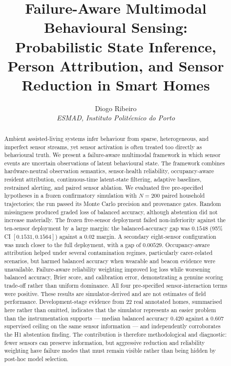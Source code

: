 \documentclass[11pt]{article}
\title{Failure-Aware Multimodal Behavioural Sensing:\\
Probabilistic State Inference, Person Attribution, and Sensor Reduction in Smart Homes}
\author{Diogo Ribeiro\\
\small \textit{ESMAD, Instituto Politécnico do Porto}}
\date{}
\begin{document}
\maketitle

\begin{abstract}
Ambient assisted-living systems infer behaviour from sparse, heterogeneous, and imperfect sensor streams, yet sensor activation is often treated too directly as behavioural truth. We present a failure-aware multimodal framework in which sensor events are uncertain observations of latent behavioural state. The framework combines hardware-neutral observation semantics, sensor-health reliability, occupancy-aware resident attribution, continuous-time latent-state filtering, adaptive baselines, restrained alerting, and paired sensor ablation. We evaluated five pre-specified hypotheses in a frozen confirmatory simulation with $N=200$ paired household trajectories; the run passed its Monte Carlo precision and provenance gates. Random missingness produced graded loss of balanced accuracy, although abstention did not increase materially. The frozen five-sensor deployment failed non-inferiority against the ten-sensor deployment by a large margin: the balanced-accuracy gap was $0.1548$ (95\% CI $[0.1531,0.1564]$) against a $0.02$ margin. A secondary eight-sensor configuration was much closer to the full deployment, with a gap of $0.00529$. Occupancy-aware attribution helped under several contamination regimes, particularly carer-related scenarios, but harmed balanced accuracy when wearable and beacon evidence were unavailable. Failure-aware reliability weighting improved log loss while worsening balanced accuracy, Brier score, and calibration error, demonstrating a genuine scoring trade-off rather than uniform dominance. All four pre-specified sensor-interaction terms were positive. These results are simulator-derived and are not estimates of field performance. Development-stage evidence from 22 real annotated homes, summarised here rather than omitted, indicates that the simulator represents an easier problem than the instrumentation supports --- median balanced accuracy $0.420$ against a $0.607$ supervised ceiling on the same sensor information --- and independently corroborates the H1 abstention finding. The contribution is therefore methodological and diagnostic: fewer sensors can preserve information, but aggressive reduction and reliability weighting have failure modes that must remain visible rather than being hidden by post-hoc model selection.
\end{abstract}
\end{document}
